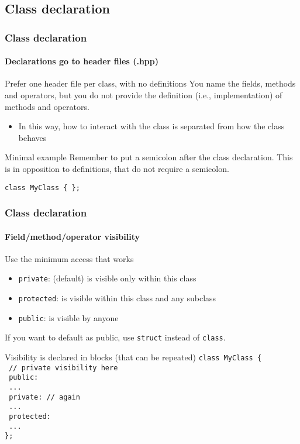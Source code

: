 \subsection{Class declaration}

\begin{frame}[fragile]
\frametitle{Class declaration}
\framesubtitle{Declarations go to header files (.hpp)}

\begin{block}{Prefer one header file per class, with no definitions}
You name the fields, methods and operators, but you do not provide the definition (i.e., implementation) of methods and operators.
\begin{itemize}
\item In this way, how to interact with the class is separated from how the class behaves
\end{itemize}
\end{block}
\pause
\begin{block}{Minimal example}
Remember to put a semicolon after the class declaration. This is in opposition to definitions, that do not require a semicolon.
\begin{verbatim}
class MyClass { };
\end{verbatim}
\end{block}

\end{frame}

\begin{frame}[fragile]
\frametitle{Class declaration}
\framesubtitle{Field/method/operator visibility}

\begin{block}{Use the minimum access that works}
\begin{itemize}
\item \texttt{private}: (default) is visible only within this class
\item \texttt{protected}: is visible within this class and any subclass
\item \texttt{public}: is visible by anyone 
\end{itemize}
If you want to default as public, use \texttt{struct} instead of \texttt{class}.
\end{block}
\pause
\begin{block}{Visibility is declared in blocks (that can be repeated)}
{ \scriptsize
\texttt{class MyClass \{ } \\
\texttt{  // private visibility here } \\
\texttt{  public: } \\
\texttt{    ... } \\
\texttt{  private: // again } \\
\texttt{    ...} \\
\texttt{  protected:} \\
\texttt{    ...} \\
\texttt{\}; } 
}
\end{block}

\end{frame}

